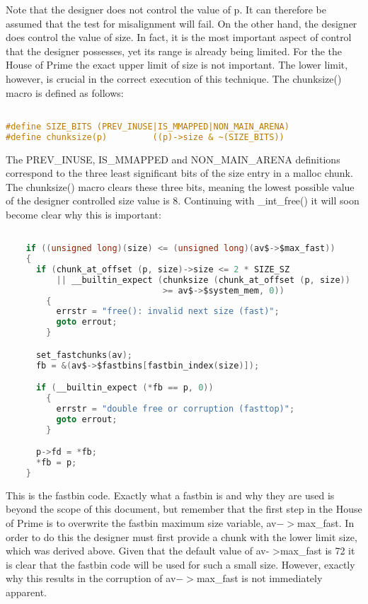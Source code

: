 \documentclass[12pt]{article}
\begin{document}
Note that the designer does not control the value of p. It can
therefore be assumed that the test for misalignment will fail. On
the other hand, the designer does control the value of size. In
fact, it is the most important aspect of control that the designer
possesses, yet its range is already being limited. For the the
House of Prime the exact upper limit of size is not important. The
lower limit, however, is crucial in the correct execution of this
technique. The chunksize() macro is defined as follows:
\begin{lstlisting}[language=C]

#define SIZE_BITS (PREV_INUSE|IS_MMAPPED|NON_MAIN_ARENA)
#define chunksize(p)         ((p)->size & ~(SIZE_BITS))
\end{lstlisting}
The PREV\_INUSE, IS\_MMAPPED and NON\_MAIN\_ARENA definitions
correspond to the three least significant bits of the size entry in
a malloc chunk. The chunksize() macro clears these three bits,
meaning the lowest possible value of the designer controlled size
value is 8. Continuing with \_int\_free() it will soon become clear
why this is important:
\begin{lstlisting}[language=C]

    if ((unsigned long)(size) <= (unsigned long)(av$->$max_fast))
    {
      if (chunk_at_offset (p, size)->size <= 2 * SIZE_SZ
          || __builtin_expect (chunksize (chunk_at_offset (p, size))
                               >= av$->$system_mem, 0))
        {
          errstr = "free(): invalid next size (fast)";
          goto errout;
        }

      set_fastchunks(av);
      fb = &(av$->$fastbins[fastbin_index(size)]);

      if (__builtin_expect (*fb == p, 0))
        {
          errstr = "double free or corruption (fasttop)";
          goto errout;
        }

      p->fd = *fb;
      *fb = p;
    }
\end{lstlisting}
This is the fastbin code. Exactly what a fastbin is and why they
are used is beyond the scope of this document, but remember that
the first step in the House of Prime is to overwrite the fastbin
maximum size variable, av$->$max\_fast. In order to do this the
designer must first provide a chunk with the lower limit size,
which was derived above. Given that the default value of av-
>max\_fast is 72 it is clear that the fastbin code will be used for
such a small size. However, exactly why this results in the
corruption of av$->$max\_fast is not immediately apparent.
\newline
\end{document}
